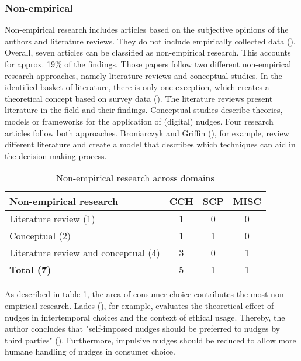 \subsubsection{Non-empirical}
Non-empirical research includes articles based on the subjective opinions of the authors and literature reviews. They do not include empirically collected data (\cite{alavi_review_1992}). Overall, seven articles can be classified as non-empirical research. This accounts for approx. 19\% of the findings. Those papers follow two different non-empirical research approaches, namely literature reviews and conceptual studies. In the identified basket of literature, there is only one exception,  which creates a theoretical concept based on survey data (\cite{gamliel_average_2017}). The literature reviews present literature in the field and their findings. Conceptual studies describe theories, models or frameworks for the application of (digital) nudges. Four research articles follow both approaches. Broniarczyk and Griffin (\citeyear{broniarczyk_decision_2014}), for example, review different literature and create a model that describes which techniques can aid in the decision-making process.

\begin{table}[htbp]
\centering
\begin{tabular}{|l|ccc|}
\hline
\textbf{Non-empirical research} & \textbf{CCH} & \textbf{SCP} & \textbf{MISC} \\ \hline
Literature review (1) & 1 & 0 & 0 \\
Conceptual (2) & 1 & 1 & 0 \\
Literature review and conceptual (4) & 3 & 0 & 1 \\ \hline
\textbf{Total (7)} & 5 & 1 & 1 \\ \hline
\end{tabular}
\caption{Non-empirical research across domains}
\label{table:non-empirical}
\end{table}

As described in table \ref{table:non-empirical}, the area of consumer choice contributes the most non-empirical research. Lades (\citeyear{lades_impulsive_2014}), for example, evaluates the theoretical effect of nudges in intertemporal choices and the context of ethical usage. Thereby, the author concludes that "self-imposed nudges should be preferred to nudges by third parties" (\cite[p.122]{lades_impulsive_2014}). Furthermore, impulsive nudges should be reduced to allow more humane handling of nudges in consumer choice.

